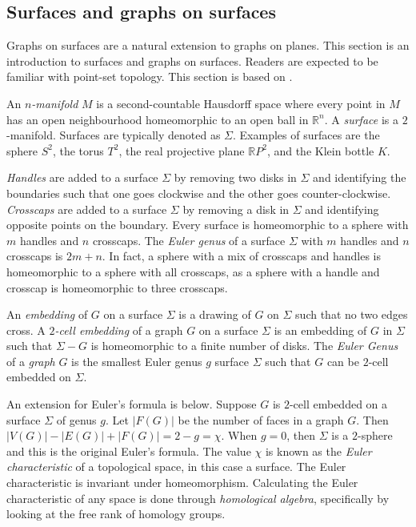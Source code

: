 \subsection{Surfaces and graphs on surfaces}
Graphs on surfaces are a natural extension to graphs on planes. This section is an introduction to surfaces and graphs on surfaces. Readers are expected to be familiar with point-set topology. This section is based on \textcite{moharGraphsSurfaces2001}.

An \textit{$n$-manifold} $M$ is a second-countable Hausdorff space where every point in $M$ has an open neighbourhood homeomorphic to an open ball in $\mathbb{R}^n$.  
A \textit{surface} is a $2$-manifold. Surfaces are typically denoted as $\Sigma$. Examples of surfaces are the sphere $S^2$, the torus $T^2$, the real projective plane $\mathbb{R}P^2$, and the Klein bottle $K$. 

\textit{Handles} are added to a surface \(\Sigma\) by removing two disks in \(\Sigma\) and identifying the boundaries such that one goes clockwise and the other goes counter-clockwise. \textit{Crosscaps} are added to a surface $\Sigma$ by removing a disk in \(\Sigma\) and identifying opposite points on the boundary. Every surface is homeomorphic to a sphere with $m$ handles and $n$ crosscaps. The \textit{Euler genus} of a surface \(\Sigma\) with $m$ handles and $n$ crosscaps is $2m + n$. In fact, a sphere with a mix of crosscaps and handles is homeomorphic to a sphere with all crosscaps, as a sphere with a handle and crosscap is homeomorphic to three crosscaps.

An \textit{embedding} of $G$ on a surface $\Sigma$ is a drawing of $G$ on $\Sigma$ such that no two edges cross. 
A \textit{$2$-cell embedding} of a graph $G$ on a surface $\Sigma$ is an embedding of $G$ in $\Sigma$ such that $\Sigma - G$ is homeomorphic to a finite number of disks. The \textit{Euler Genus} of a \textit{graph} \(G\) is the smallest Euler genus \(g\) surface \(\Sigma\) such that \(G\) can be $2$-cell embedded on $\Sigma$.

An extension for Euler's formula is below. Suppose $G$ is $2$-cell embedded on a surface $\Sigma$ of genus $g$. Let \(|F(G)|\) be the number of faces in a graph \(G\). Then \(|V(G)| - |E(G)| + |F(G)| = 2 - g = \chi\). When $g = 0$, then $\Sigma$ is a $2$-sphere and this is the original Euler's formula. 
The value $\chi$ is known as the \textit{Euler characteristic} of a topological space, in this case a surface. The Euler characteristic is invariant under homeomorphism. Calculating the Euler characteristic of any space is done through \textit{homological algebra}, specifically by looking at the free rank of homology groups. 

